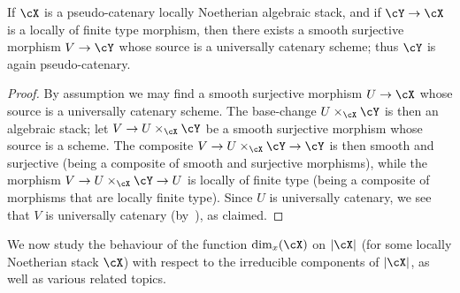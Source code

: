 \begin{alemma}
	\label{lem:catenary covers}
	If $\cX$ is a pseudo-catenary locally Noetherian algebraic
	stack, and if $\cY \to \cX$ is a locally of finite type morphism,
	then there exists a smooth surjective morphism $V \to \cY$
	whose source is a universally catenary scheme; thus
	$\cY$ is again pseudo-catenary.
\end{alemma}
\begin{proof}
	By assumption we may find a smooth surjective morphism
	$U \to \cX$ whose source is a universally catenary scheme.
	The base-change $U\times_{\cX} \cY$ is then an algebraic
	stack; let $V \to U\times_{\cX} \cY$ be a smooth
	surjective morphism whose source is a scheme.  
	The composite $V \to U\times_{\cX} \cY \to \cY$ is then
	smooth and surjective (being a composite of smooth and
	surjective morphisms), while the morphism $V \to U\times_{\cX}
	\cY \to U$ is locally of finite type (being a composite 
	of morphisms that are locally finite type).  Since $U$
	is universally catenary, we see that $V$ is universally catenary
(by~\cite[\href{http://stacks.math.columbia.edu/tag/02J9}{Tag 02J9}]{stacks-project}),
	as claimed.
\end{proof}

We now study the behaviour of the function $\dim_x(\cX)$ on $|\cX|$
(for some locally Noetherian stack $\cX$) with respect to the irreducible
components of $|\cX|$, as well as various
related topics.



